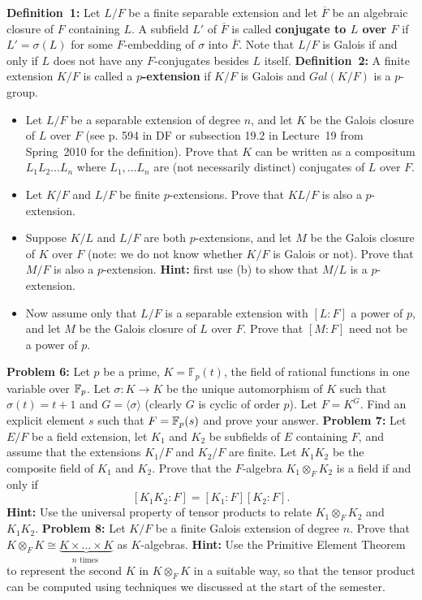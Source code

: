 \documentclass[11pt]{amsart}
\begin{document}
{\bf Definition~1:} Let $L/F$ be a finite separable extension
and let $\overline F$ be an algebraic closure of $F$ containing $L$.
A subfield $L'$ of $\overline F$ is called
{\bf conjugate to $L$ over $F$} if $L'=\sigma(L)$ for some $F$-embedding of
$\sigma$ into $\overline F$. Note that $L/F$ is Galois if and
only if $L$ does not have any $F$-conjugates besides $L$ itself.
\skv
{\bf Definition~2:} A finite extension $K/F$ is called
a {\bf $p$-extension} if $K/F$ is Galois and $Gal(K/F)$ is a $p$-group.
\skv
\begin{itemize}
\item[(a)] Let $L/F$ be a separable extension of degree $n$, and
let $K$ be the Galois closure of $L$ over $F$ (see p. 594 in DF or subsection 19.2 in Lecture~19 from Spring~2010 for the definition). 
Prove that $K$ can be written as a compositum $L_1L_2\ldots L_n$
where $L_1,\ldots L_n$ are (not necessarily distinct) conjugates of
$L$ over $F$.

\item[(b)] Let $K/F$ and $L/F$ be finite $p$-extensions. Prove
that $KL/F$ is also a $p$-extension.

\item[(c)] Suppose $K/L$ and $L/F$ are both $p$-extensions, and
let $M$ be the Galois closure of $K$ over $F$ (note: we do
not know whether $K/F$ is Galois or not). Prove that
$M/F$ is also a $p$-extension. {\bf Hint:} first use (b) to show that
$M/L$ is a $p$-extension.

\item[(d)] Now assume only that $L/F$ is a separable extension
with $[L:F]$ a power of $p$, and let $M$ be the Galois closure
of $L$ over $F$. Prove that $[M:F]$ need not be a power of $p$.
\end{itemize}
\skv
{\bf Problem 6:} Let $p$ be a prime, $K=\mathbb F_p(t)$, the field of rational functions in one variable over ${\mathbb F}_p$.
Let $\sigma:K\to K$ be the unique automorphism of $K$ such that $\sigma(t)=t+1$ and $G=\langle \sigma\rangle$ (clearly
$G$ is cyclic of order $p$). Let $F=K^G$. Find an explicit element $s$ such that $F={\mathbb F}_p(s)$ and prove your answer.
\skv
{\bf Problem 7:} 
Let $E/F$ be a field extension, let $K_1$ and $K_2$ be subfields of $E$ containing $F$,
and assume that the extensions $K_1/F$ and $K_2/F$ are finite. Let $K_1 K_2$ be the composite
field of $K_1$ and $K_2$. Prove that the $F$-algebra $K_1\otimes_F K_2$ is a field if and only if
$$[K_1 K_2: F]=[K_1: F][K_2: F].$$ {\bf Hint:} Use the universal property of tensor products to relate
$K_1\otimes_F K_2$ and $K_1 K_2$.
\skv
{\bf Problem 8:} Let $K/F$ be a finite Galois extension of degree $n$. Prove that
$K\otimes_F K\cong \underbrace{K\times\ldots\times K}_{n \mbox{ times }}$ as $K$-algebras. {\bf Hint:} Use the
Primitive Element Theorem to represent the second $K$ in $K\otimes_F K$ in a suitable way, so that the tensor
product can be computed using techniques we discussed at the start of the semester.
\end{document}
